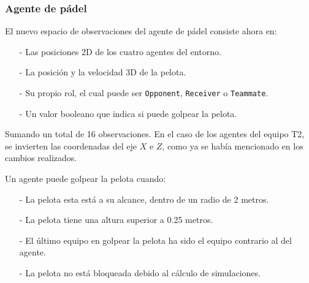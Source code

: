 \subsubsection{Agente de pádel}

El nuevo espacio de observaciones del agente de pádel consiste ahora en:
\begin{enumerate}
    \item[-] Las posiciones 2D de los cuatro agentes del entorno.
    \item[-] La posición y la velocidad 3D de la pelota.
    \item[-] Su propio rol, el cual puede ser \texttt{Opponent}, \texttt{Receiver} o \texttt{Teammate}.
    \item[-] Un valor booleano que indica si puede golpear la pelota.
\end{enumerate}
Sumando un total de 16 observaciones. En el caso de los agentes del equipo T2, se invierten las coordenadas del eje $X$ e $Z$, como ya se había mencionado en los cambios realizados.

\newpage

Un agente puede golpear la pelota cuando:
\begin{enumerate}
    \item[-] La pelota esta está a su alcance, dentro de un radio de 2 metros.
    \item[-] La pelota tiene una altura superior a 0.25 metros.
    \item[-] El último equipo en golpear la pelota ha sido el equipo contrario al del agente.
    \item[-] La pelota no está bloqueada debido al cálculo de simulaciones.
\end{enumerate}

